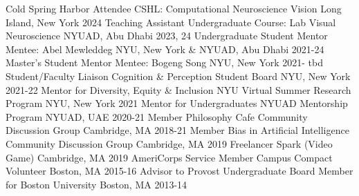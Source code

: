 \begin{cvhonors}
  \cvhonor
    {Cold Spring Harbor Attendee}
    {CSHL: Computational Neuroscience Vision}
    {Long Island, New York}
    {2024}
  \cvhonor
    {Teaching Assistant}
    {Undergraduate Course: Lab Visual Neuroscience}
    {NYUAD, Abu Dhabi}
    {2023, 24}
  \cvhonor
    {Undergraduate Student Mentor}
    {Mentee: Abel Mewleddeg}
    {NYU, New York \& NYUAD, Abu Dhabi}
    {2021-24}
  \cvhonor
    {Master's Student Mentor}
    {Mentee: Bogeng Song}
    {NYU, New York}
    {2021- tbd}
  \cvhonor
    {Student/Faculty Liaison}
    {Cognition \& Perception Student Board}
    {NYU, New York}
    {2021-22}
  \cvhonor
    {Mentor for Diversity, Equity \& Inclusion}
    {NYU Virtual Summer Research Program}
    {NYU, New York}
    {2021}
  \cvhonor
    {Mentor for Undergraduates}
    {NYUAD Mentorship Program}
    {NYUAD, UAE}
    {2020-21}
   \cvhonor
    {Member}
    {Philosophy Cafe Community Discussion Group}
    {Cambridge, MA}
    {2018-21}
  \cvhonor
    {Member}
    {Bias in Artificial Intelligence Community Discussion Group}
    {Cambridge, MA}
    {2019}
  \cvhonor
    {Freelancer}
    {Spark (Video Game)}
    {Cambridge, MA}
    {2019}
  \cvhonor
    {AmeriCorps Service Member}
    {Campus Compact Volunteer}
    {Boston, MA}
    {2015-16}
  \cvhonor
    {Advisor to Provost}
    {Undergraduate Board Member for Boston University}
    {Boston, MA}
    {2013-14}
\end{cvhonors}
